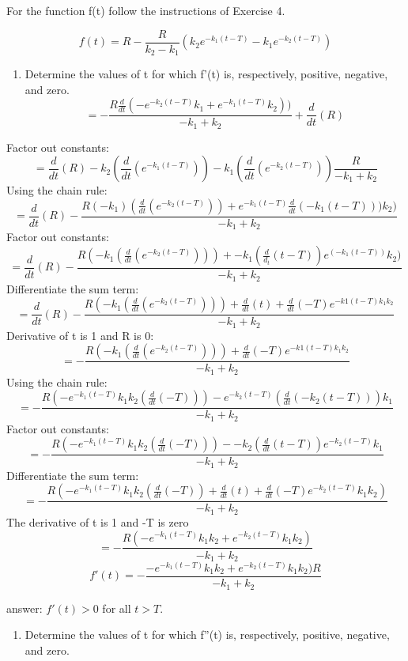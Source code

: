 \documentclass[]{article}
\providecommand{\tightlist}{%
  \setlength{\itemsep}{0pt}\setlength{\parskip}{0pt}}
\begin{document}
For the function f(t) follow the instructions of Exercise 4.

\[f(t) = R - \frac{R}{k_2 - k_1}(k_2 e^{-k_1(t-T)}-k_1 e^{-k_2(t-T)})\]

\begin{enumerate}
\def\labelenumi{(\alph{enumi})}
\tightlist
\item
  Determine the values of t for which f'(t) is, respectively, positive,
  negative, and zero.
  \[=- \frac{R \frac{d}{dt}(-e^{-k_2 (t-T)}k_1 + e^{-k_1(t - T)}k_2))}{-k_1 + k_2} + \frac{d}{dt}(R)\]
\end{enumerate}

Factor out constants:
\[=\frac{d}{dt}(R) - k_2(\frac{d}{dt}(e^{-k_1(t - T)})) - k_1 (\frac{d}{dt}(e^{-k_2(t-T)})) \frac{R}{-k_1 + k_2}\]
Using the chain rule:
\[=\frac{d}{dt}(R)-\frac{R(-k_1)(\frac{d}{dt}(e^{-k_2(t-T)})) + e^{-k_1(t-T)}\frac{d}{dt}(-k_1(t-T)))k_2)}{-k_1+ k_2}\]
Factor out constants:
\[=\frac{d}{dt}(R) - \frac{R(-k_1(\frac{d}{dt}(e^{-k_2(t-T)})))+-k_1(\frac{d}{d_t}(t-T))e^(-k_1(t-T))k_2)}{-k_1 + k_2}\]
Differentiate the sum term:
\[=\frac{d}{dt}(R) - \frac{R(-k_1(\frac{d}{dt}(e^{-k_2(t-T)})))+ \frac{d}{dt}(t) + \frac{d}{dt}(-T)e^{-k1(t-T)k_1 k_2}}{-k_1 + k_2}\]
Derivative of t is 1 and R is 0:
\[=- \frac{R(-k_1(\frac{d}{dt}(e^{-k_2(t-T)})))+ \frac{d}{dt}(-T)e^{-k1(t-T)k_1 k_2}}{-k_1 + k_2}\]
Using the chain rule:
\[=-\frac{R(-e^{-k_1 (t-T)}k_1 k_2(\frac{d}{dt}(-T)))- e^{-k_2(t-T)}(\frac{d}{dt}(-k_2(t-T)))k_1}{-k_1 + k_2}\]
Factor out constants:
\[=-\frac{R(-e^{-k_1 (t-T)}k_1 k_2(\frac{d}{dt}(-T)))- -k_2(\frac{d}{dt}(t-T))e^{-k_2 (t-T)}k_1}{-k_1 + k_2}\]
Differentiate the sum term:
\[=-\frac{R(-e^{-k_1(t-T)}k_1 k_2(\frac{d}{dt}(-T)) + \frac{d}{dt}(t)+\frac{d}{dt}(-T)e^{-k_2(t-T)}k_1 k_2)}{-k_1 + k_2}\]
The derivative of t is 1 and -T is zero
\[=-\frac{R(-e^{-k_1(t-T)}k_1 k_2 + e^{-k_2(t-T)}k_1 k_2)}{-k_1 + k_2}\]
\[f'(t)=-\frac{-e^{-k_1 (t -T)}k_1 k_2 + e^{-k_2(t-T)}k_1 k_2)R}{-k_1 + k_2}\]

answer: \(f'(t) > 0\) for all \(t > T\).

\begin{enumerate}
\def\labelenumi{(\alph{enumi})}
\setcounter{enumi}{1}
\tightlist
\item
  Determine the values of t for which f''(t) is, respectively, positive,
  negative, and zero.
\end{enumerate}
\end{document}
